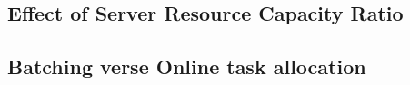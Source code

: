 \subsection{Effect of Server Resource Capacity Ratio}\label{subsec:affect-of-server-resource-capacity-ratio}

\subsection{Batching verse Online task allocation}\label{subsec:batching-verse-online-task-allocation}
